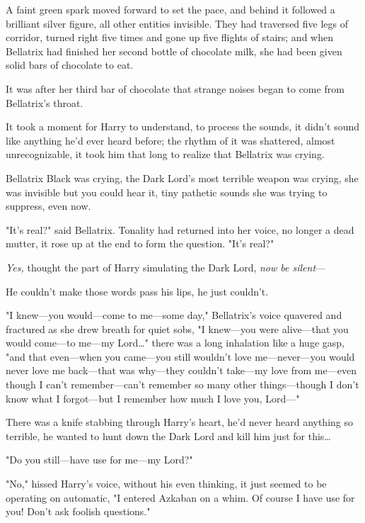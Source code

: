 
\lettrine{A}{} faint green
spark moved forward to set the pace, and behind it followed a brilliant silver
figure, all other entities invisible. They had traversed five legs of corridor,
turned right five times and gone up five flights of stairs; and when Bellatrix
had finished her second bottle of chocolate milk, she had been given solid bars
of chocolate to eat.

It was after her third bar of chocolate that strange noises began to come from
Bellatrix's throat.

It took a moment for Harry to understand, to process the sounds, it didn't
sound like anything he'd ever heard before; the rhythm of it was shattered,
almost unrecognizable, it took him that long to realize that Bellatrix was
crying.

Bellatrix Black was crying, the Dark Lord's most terrible weapon was crying,
she was invisible but you could hear it, tiny pathetic sounds she was trying to
suppress, even now.

"It's real?" said Bellatrix. Tonality had returned into her voice, no longer a
dead mutter, it rose up at the end to form the question. "It's real?"

\emph{Yes,} thought the part of Harry simulating the Dark Lord, \emph{now be
silent}---

He couldn't make those words pass his lips, he just couldn't.

"I knew---you would---come to me---some day," Bellatrix's voice quavered and
fractured as she drew breath for quiet sobs, "I knew---you were alive---that
you would come---to me---my Lord…" there was a long inhalation like a
huge gasp, "and that even---when you came---you still wouldn't love
me---never---you would never love me back---that was why---they couldn't
take---my love from me---even though I can't remember---can't remember so many
other things---though I don't know what I forgot---but I remember how much I
love you, Lord---"

There was a knife stabbing through Harry's heart, he'd never heard anything so
terrible, he wanted to hunt down the Dark Lord and kill him just for
this…

"Do you still---have use for me---my Lord?"

"No," hissed Harry's voice, without his even thinking, it just seemed to be
operating on automatic, "I entered Azkaban on a whim. Of course I have use for
you! Don't ask foolish questions."

